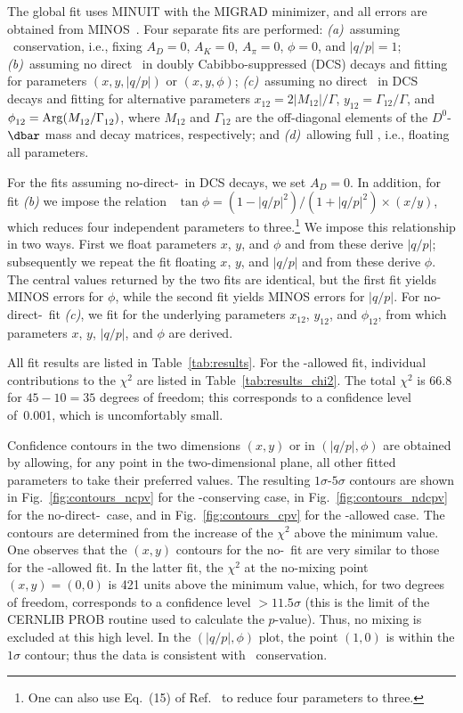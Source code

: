 The global fit uses MINUIT with the MIGRAD minimizer, 
and all errors are obtained from MINOS~\cite{MINUIT:webpage}. 
Four separate fits are performed: 
{\it (a)}\ assuming \cp\ conservation, i.e., fixing
$A^{}_D\!=\!0$, $A_K\!=\!0$, $A^{}_\pi\!=\!0$, $\phi\!=\!0$, 
and $|q/p|\!=\!1$;
{\it (b)}\ assuming no direct \cpv\ in doubly Cabibbo-suppressed (DCS)
decays and fitting for parameters $(x,y,|q/p|)$ or $(x,y,\phi)$; 
{\it (c)}\ assuming no direct \cpv\ in DCS decays and fitting for
alternative parameters $x^{}_{12}= 2|M^{}_{12}|/\Gamma$, 
$y^{}_{12}= \Gamma^{}_{12}/\Gamma$, and 
$\phi^{}_{12}= {\rm Arg}(M^{}_{12}/\Gamma^{}_{12})$,
where $M^{}_{12}$ and $\Gamma^{}_{12}$ are the off-diagonal
elements of the $D^0$-$\dbar$ mass and decay matrices, respectively; and
{\it (d)}\ allowing full \cpv, i.e., floating all parameters. 

For the fits assuming no-direct-\cpv\ in DCS decays, 
we set $A^{}_D\!=\!0$. In addition, for fit 
{\it (b)\/} we impose the relation~\cite{Ciuchini:2007cw,Kagan:2009gb}
$\tan\phi = (1-|q/p|^2)/(1+|q/p|^2)\times (x/y)$, which reduces 
four independent parameters to 
three.\footnote{One can also use Eq.~(15) of Ref.~\cite{Grossman:2009mn}
to reduce four parameters to three.} 
We impose this relationship in two ways. First we float parameters
$x$, $y$, and $\phi$ and from these derive $|q/p|$; subsequently we
repeat the fit floating $x$, $y$, and $|q/p|$ and from these derive 
$\phi$. The central values returned by the two fits are identical,
but the first fit yields MINOS errors for $\phi$, while the second
fit yields MINOS errors for $|q/p|$. For no-direct-\cpv\ fit 
{\it (c)}, we fit for the underlying parameters $x^{}_{12}$, $y^{}_{12}$, 
and $\phi^{}_{12}$, from which parameters $x$, $y$, $|q/p|$, and $\phi$ 
are derived. 

All fit results are listed in 
Table~\ref{tab:results}. For the \cpv-allowed fit,
individual contributions to the $\chi^2$ are listed 
in Table~\ref{tab:results_chi2}. The total $\chi^2$ 
is 66.8 for $45-10=35$ degrees of freedom; this 
corresponds to a confidence level of~0.001,
which is uncomfortably small.

Confidence contours in the two dimensions $(x,y)$ or 
in $(|q/p|,\phi)$ are obtained by allowing, for any point in the
two-dimensional plane, all other fitted parameters to take their 
preferred values. The resulting $1\sigma$-$5\sigma$ contours 
are shown 
in Fig.~\ref{fig:contours_ncpv} for the \cp-conserving case, 
in Fig.~\ref{fig:contours_ndcpv} for the no-direct-\cpv\ case, 
and in Fig.~\ref{fig:contours_cpv} for the \cpv-allowed 
case. The contours are determined from the increase of the
$\chi^2$ above the minimum value.
One observes that the $(x,y)$ contours for the no-\cpv\ fit 
are very similar to those for the \cpv-allowed fit. In the latter
fit, the $\chi^2$ at the no-mixing point $(x,y)\!=\!(0,0)$ is 421
units above the minimum value, which, for two degrees of freedom,
corresponds to a confidence level $>11.5\sigma$ (this is the limit
of the CERNLIB PROB routine used to calculate the $p$-value). Thus,
no mixing is excluded at this high level. In the $(|q/p|,\phi)$ plot,
the point $(1,0)$ is within the $1\sigma$ contour; thus the data is
consistent with \cp\ conservation.

